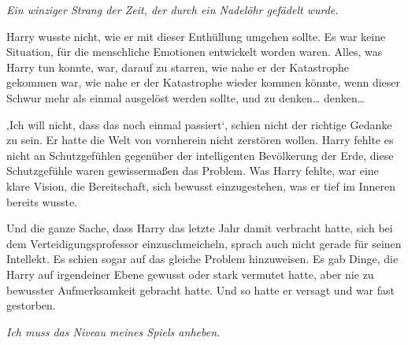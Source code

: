 \emph{Ein winziger Strang der Zeit, der durch ein Nadelöhr gefädelt wurde.}

Harry wusste nicht, wie er mit dieser Enthüllung umgehen sollte. Es war keine Situation, für die menschliche Emotionen entwickelt worden waren. Alles, was Harry tun konnte, war, darauf zu starren, wie nahe er der Katastrophe gekommen war, wie nahe er der Katastrophe wieder kommen könnte, wenn dieser Schwur mehr als einmal ausgelöst werden sollte, und zu denken… denken…

‚Ich will nicht, dass das noch einmal passiert‘, schien nicht der richtige Gedanke zu sein. Er hatte die Welt von vornherein nicht zerstören wollen. Harry fehlte es nicht an Schutzgefühlen gegenüber der intelligenten Bevölkerung der Erde, diese Schutzgefühle waren gewissermaßen das Problem. Was Harry fehlte, war eine klare Vision, die Bereitschaft, sich bewusst einzugestehen, was er tief im Inneren bereits wusste.

Und die ganze Sache, dass Harry das letzte Jahr damit verbracht hatte, sich bei dem Verteidigungsprofessor einzuschmeicheln, sprach auch nicht gerade für seinen Intellekt. Es schien sogar auf das gleiche Problem hinzuweisen. Es gab Dinge, die Harry auf irgendeiner Ebene gewusst oder stark vermutet hatte, aber nie zu bewusster Aufmerksamkeit gebracht hatte. Und so hatte er versagt und war fast gestorben.

\emph{Ich muss das Niveau meines Spiels anheben.}

